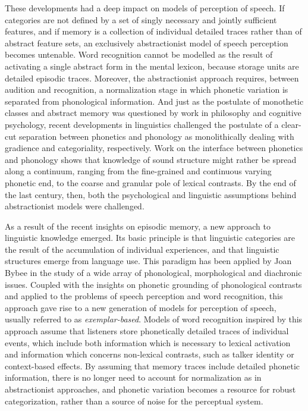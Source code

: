 These developments had a deep impact on models of perception of speech. If categories are not defined by a set of singly necessary and jointly sufficient features, and if memory is a collection of individual detailed traces rather than of abstract feature sets, an exclusively abstractionist model of speech perception becomes untenable. Word recognition cannot be modelled as the result of activating a single abstract form in the mental lexicon, because storage units are detailed episodic traces. Moreover, the abstractionist approach requires, between audition and recognition, a normalization stage in which phonetic variation is separated from phonological information. And just as the postulate of monothetic classes and abstract memory was questioned by work in philosophy and cognitive psychology, recent developments in linguistics challenged the postulate of a clear-cut separation between phonetics and phonology as monolithically dealing with gradience and categoriality, respectively. Work on the interface between phonetics and phonology shows that knowledge of sound structure might rather be spread along a continuum, ranging from the fine-grained and continuous varying phonetic end, to the coarse and granular pole of lexical contrasts. By the end of the last century, then, both the psychological and linguistic assumptions behind abstractionist models were challenged.

As a result of the recent insights on episodic memory, a new approach to linguistic knowledge emerged. Its basic principle is that linguistic categories are the result of the accumulation of individual experiences, and that linguistic structures emerge from language use. This paradigm has been applied by Joan Bybee in the study of a wide array of phonological, morphological and diachronic issues. Coupled with the insights on phonetic grounding of phonological contrasts and applied to the problems of speech perception and word recognition, this approach gave rise to a new generation of models for perception of speech, usually referred to as \textit{exemplar-based}. Models of word recognition inspired by this approach assume that listeners store phonetically detailed traces of individual events, which include both information which is necessary to lexical activation and information which concerns non-lexical contrasts, such as talker identity or context-based effects. By assuming that memory traces include detailed phonetic information, there is no longer need to account for normalization as in abstractionist approaches, and phonetic variation 
\enlargethispage{1em}
becomes a resource for robust categorization, rather than a source of noise for the perceptual system.

